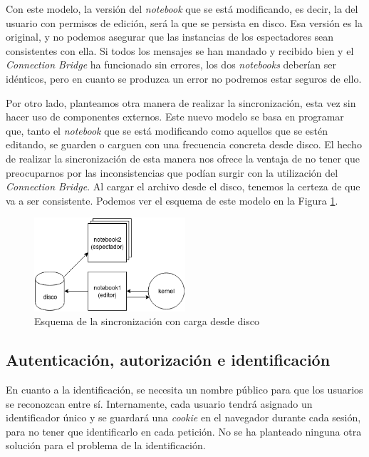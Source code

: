 \documentclass[11pt,spanish,listoffigures]{tfgetsinf}
\begin{document}
Con este modelo, la versión del \textit{notebook} que se está modificando, es decir, la del usuario con permisos de edición, será la que se persista en disco. Esa versión es la original, y no podemos asegurar que las instancias de los espectadores sean consistentes con ella. Si todos los mensajes se han mandado y recibido bien y el \textit{Connection Bridge} ha funcionado sin errores, los dos \textit{notebooks} deberían ser idénticos, pero en cuanto se produzca un error no podremos estar seguros de ello.

Por otro lado, planteamos otra manera de realizar la sincronización, esta vez sin hacer uso de componentes externos. Este nuevo modelo se basa en programar que, tanto el \textit{notebook} que se está modificando como aquellos que se estén editando, se guarden o carguen con una frecuencia concreta desde disco. El hecho de realizar la sincronización de esta manera nos ofrece la ventaja de no tener que preocuparnos por las inconsistencias que podían surgir con la utilización del \textit{Connection Bridge}. Al cargar el archivo desde el disco, tenemos la certeza de que va a ser consistente. Podemos ver el esquema de este modelo en la Figura \ref{fig:disk-scheme}.

\begin{figure}[h]
	\centering
  	\includegraphics[width=0.5\textwidth]{JSON-sync.png}
  	\caption{Esquema de la sincronización con carga desde disco}
  	\label{fig:disk-scheme}
\end{figure}


\subsection{Autenticación, autorización e identificación}
\label{subsec:identificacin-permisos}

En cuanto a la identificación, se necesita un nombre público para que los usuarios se reconozcan entre sí. Internamente, cada usuario tendrá asignado un identificador único y se guardará una \textit{\gls{cookie}} en el navegador durante cada sesión, para no tener que identificarlo en cada petición. No se ha planteado ninguna otra solución para el problema de la identificación.
\end{document}
